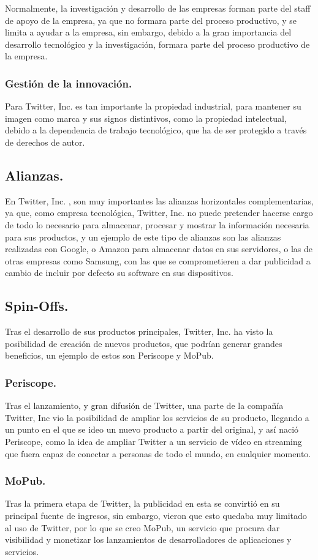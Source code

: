 Normalmente, la investigación y desarrollo de las empresas forman parte del staff de apoyo de la empresa, ya que no formara parte del proceso productivo, y se limita a ayudar a la empresa, sin embargo, debido a la gran importancia del desarrollo tecnológico y la investigación, formara parte del proceso productivo de la empresa.

\subsubsection{Gestión de la innovación.}

Para Twitter, Inc. es tan importante la propiedad industrial, para mantener su imagen como marca y sus signos distintivos, como la propiedad intelectual, debido a la dependencia de trabajo tecnológico, que ha de ser protegido a través de derechos de autor.


\subsection{Alianzas.}

En Twitter, Inc. , son muy importantes las alianzas horizontales complementarias, ya que, como empresa tecnológica, Twitter, Inc. no puede pretender hacerse cargo de todo lo necesario para almacenar, procesar y mostrar la información necesaria para sus productos, y un ejemplo de este tipo de alianzas son las alianzas realizadas con Google, o Amazon para almacenar datos en sus servidores, o las de otras empresas como Samsung, con las que se comprometieren a dar publicidad a cambio de incluir por defecto su software en sus dispositivos.

\subsection{Spin-Offs.}

Tras el desarrollo de sus productos principales, Twitter, Inc. ha visto la posibilidad de creación de nuevos productos, que podrían generar grandes beneficios, un ejemplo de estos son Periscope y MoPub.

\subsubsection{Periscope.}

Tras el lanzamiento, y gran difusión de Twitter, una parte de la compañía Twitter, Inc vio la posibilidad de ampliar los servicios de su producto, llegando a un punto en el que se ideo un nuevo producto a partir del original, y así nació Periscope, como la idea de ampliar Twitter a un servicio de vídeo en streaming que fuera capaz de conectar a personas de todo el mundo, en cualquier momento.

\subsubsection{MoPub.}

Tras la primera etapa de Twitter, la publicidad en esta se convirtió en su principal fuente de ingresos, sin embargo, vieron que esto quedaba muy limitado al uso de Twitter, por lo que se creo MoPub, un servicio que procura dar visibilidad y monetizar los lanzamientos de desarrolladores de aplicaciones y servicios.
